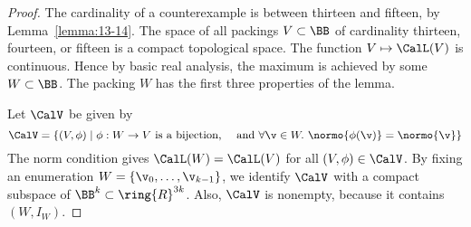 \begin{proof} 
  The cardinality of a counterexample is between thirteen and fifteen, by
  Lemma~\ref{lemma:13-14}.  The space of all packings $V\subset \BB$
  of cardinality thirteen, fourteen, or fifteen is a compact topological space.
  The function $V\mapsto {\CalL(V)}$ is continuous.  Hence by basic
    real analysis, the maximum is achieved by some $W\subset \BB$.
The packing $W$ has the first three properties of the lemma.

Let $\CalV$ be given by
\[
\CalV = 
\{
(V,\phi)\mid \phi:W\to V \text{ is a bijection, ~~~and }
\forall \v\in W.~
\normo{\phi(\v)}=\normo{\v}
\}
\]
The norm condition gives $\CalL(W)=\CalL(V)$ for all $(V,\phi)\in \CalV$.
By fixing an enumeration $W=\{\v_0,\ldots,\v_{k-1}\}$, we identify
$\CalV$ with a compact subspace of $\BB^k\subset\ring{R}^{3k}$.
Also, $\CalV$ is nonempty, because it contains $(W,I_{W})$.





\end{proof}
